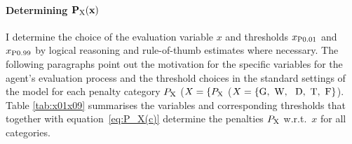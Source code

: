 
\paragraph{Determining $\mathbf{P_{\rm X}(x)}$}
I determine the choice of the evaluation variable $x$ and thresholds $x_{\rm P0.01}$ and $x_{\rm P0.99}$ by logical reasoning and rule-of-thumb estimates where necessary.
The following paragraphs point out the motivation for the specific variables for the agent's evaluation process and the threshold choices in the standard settings of the model for each penalty category $P_{\rm X}$ ($X=\{P_{\rm X}$ ($X=\{\text{G,\, W, \, D,\, T,\, F}\}$).
Table \ref{tab:x01x09} summarises the variables and corresponding thresholds that together with equation~\ref{eq:P_X(c)} determine the penalties $P_{\rm X}$ w.r.t.\ $x$ for all categories.


